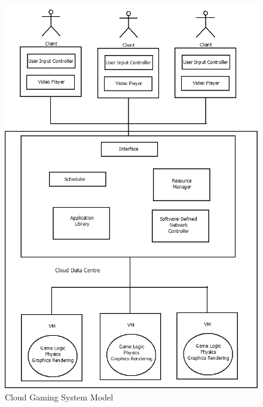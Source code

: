 \clearpage
\begin{figure}[h!]
 \centering
 \includegraphics[width=0.9\linewidth]{images/cloudsystemmodel.png}
 \caption{Cloud Gaming System Model}
 \label{fig:cloudmodel}
\end{figure}


